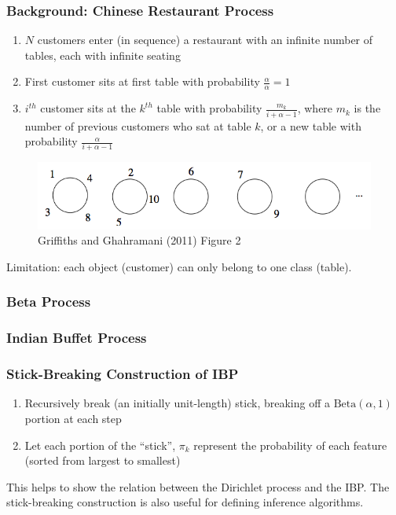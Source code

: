 \documentclass[13pt]{beamer}
\begin{document}
\begin{frame}
\frametitle{Background: Chinese Restaurant Process}

\begin{enumerate}
\item $N$ customers enter (in sequence) a restaurant with an infinite number of tables, each with infinite seating
\item First customer sits at first table with probability $\frac{\alpha}{\alpha}=1$
\item $i^{th}$ customer sits at the $k^{th}$ table with probability $\frac{m_k}{i+\alpha-1}$, where $m_k$ is the number of previous customers who sat at table $k$, or a new table with probability $\frac{\alpha}{i+\alpha-1}$
\end{enumerate}

\begin{figure}
\begin{center}
\includegraphics[scale=0.3]{./img/crp-example.png}
\caption{Griffiths and Ghahramani (2011) Figure 2}
\end{center}
\end{figure}

Limitation: each object (customer) can only belong to one class (table).

\end{frame}
\begin{frame}
\frametitle{Beta Process}
\end{frame}
\begin{frame}
\frametitle{Indian Buffet Process}
\end{frame}
\begin{frame}
\frametitle{Stick-Breaking Construction of IBP}

\begin{enumerate}
\item Recursively break (an initially unit-length) stick, breaking off a $\text{Beta}(\alpha, 1)$ portion at each step
\item Let each portion of the ``stick'', $\pi_k$ represent the probability of each feature (sorted from largest to smallest)
\end{enumerate}

This helps to show the relation between the Dirichlet process and the IBP. The stick-breaking construction is also useful for defining inference algorithms.

\end{frame}
\end{document}
